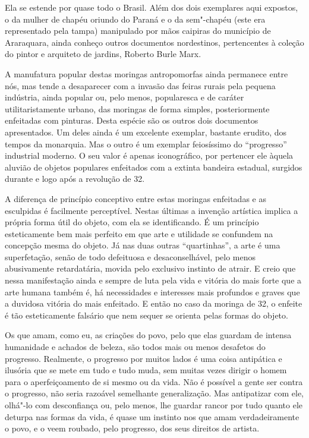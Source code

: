 Ela se estende por quase todo o Brasil. Além dos dois exemplares aqui
expostos, o da mulher de chapéu oriundo do Paraná e o da sem"-chapéu
(este era representado pela tampa) manipulado por mãos caipiras do
município de Araraquara, ainda conheço outros documentos nordestinos,
pertencentes à coleção do pintor e arquiteto de jardins, Roberto Burle
Marx.

A manufatura popular destas moringas antropomorfas ainda permanece entre
nós, mas tende a desaparecer com a invasão das feiras rurais pela
pequena indústria, ainda popular ou, pelo menos, popularesca e de
caráter utilitaristamente urbano, das moringas de forma simples,
posteriormente enfeitadas com pinturas. Desta espécie são os outros dois
documentos apresentados. Um deles ainda é um excelente exemplar,
bastante erudito, dos tempos da monarquia. Mas o outro é um exemplar
feiosíssimo do ``progresso'' industrial moderno. O seu valor é apenas
iconográfico, por pertencer ele àquela aluvião de objetos populares
enfeitados com a extinta bandeira estadual, surgidos durante e logo após
a revolução de 32.

A diferença de princípio conceptivo entre estas moringas enfeitadas e as
esculpidas é facilmente perceptível. Nestas últimas a invenção artística
implica a própria forma útil do objeto, com ela se identificando. É um
princípio esteticamente bem mais perfeito em que arte e utilidade se
confundem na concepção mesma do objeto. Já nas duas outras
``quartinhas'', a arte é uma superfetação, senão de todo defeituosa e
desaconselhável, pelo menos abusivamente retardatária, movida pelo
exclusivo instinto de atrair. E creio que nessa manifestação ainda e
sempre de luta pela vida e vitória do mais forte que a arte humana
também é, há necessidades e interesses mais profundos e graves que a
duvidosa vitória do mais enfeitado. E então no caso da moringa de 32, o
enfeite é tão esteticamente falsário que nem sequer se orienta pelas
formas do objeto.

Os que amam, como eu, as criações do povo, pelo que elas guardam de
intensa humanidade e achados de beleza, são todos mais ou menos
desafetos do progresso. Realmente, o progresso por muitos lados é uma
coisa antipática e ilusória que se mete em tudo e tudo muda, sem muitas
vezes dirigir o homem para o aperfeiçoamento de si mesmo ou da vida. Não
é possível a gente ser contra o progresso, não seria razoável semelhante
generalização. Mas antipatizar com ele, olhá"-lo com desconfiança ou,
pelo menos, lhe guardar rancor por tudo quanto ele deturpa nas formas da
vida, é quase um instinto nos que amam verdadeiramente o povo, e o veem
roubado, pelo progresso, dos seus direitos de artista.

